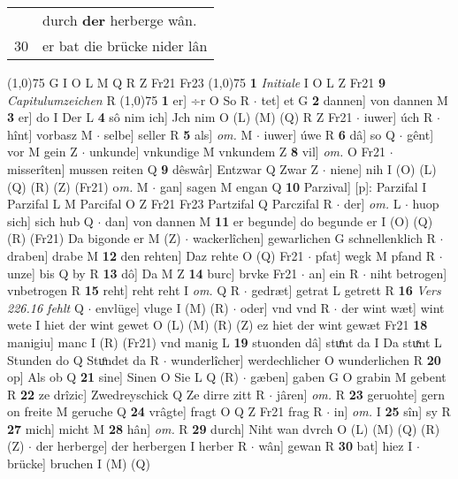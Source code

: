 \documentclass[8pt,a4paper,notitlepage]{article}
\begin{document}
\begin{table}[ht]
\begin{minipage}[t]{0.5\linewidth}
\begin{tabular}{rl}
 & durch \textbf{der} herberge wân.\\ 
30 & er bat die brücke nider lân\\ 
\end{tabular}
\scriptsize
\line(1,0){75} \newline
G I O L M Q R Z Fr21 Fr23 \newline
\line(1,0){75} \newline
\textbf{1} \textit{Initiale} I O L Z Fr21  \textbf{9} \textit{Capitulumzeichen} R  \newline
\line(1,0){75} \newline
\textbf{1} er] ÷r O So R  $\cdot$ tet] et G \textbf{2} dannen] von dannen M \textbf{3} er] do I Der L \textbf{4} sô nim ich] Jch nim O (L) (M) (Q) R Z Fr21  $\cdot$ iuwer] úch R  $\cdot$ hînt] vorbasz M  $\cdot$ selbe] seller R \textbf{5} als] \textit{om.} M  $\cdot$ iuwer] úwe R \textbf{6} dâ] so Q  $\cdot$ gênt] vor M gein Z  $\cdot$ unkunde] vnkundige M vnkundem Z \textbf{8} vil] \textit{om.} O Fr21  $\cdot$ misserîten] mussen reiten Q \textbf{9} dêswâr] Entzwar Q Zwar Z  $\cdot$ niene] nih I (O) (L) (Q) (R) (Z) (Fr21) o\textit{m. } M  $\cdot$ gan] sagen M engan Q \textbf{10} Parzival] [p]: Parzifal I Parzifal L M Parcifal O Z Fr21 Fr23 Partzifal Q Parczifal R  $\cdot$ der] \textit{om.} L  $\cdot$ huop sich] sich hub Q  $\cdot$ dan] von dannen M \textbf{11} er begunde] do begunde er I (O) (Q) (R) (Fr21) Da bigonde er M (Z)  $\cdot$ wackerlîchen] gewarlichen G schnellenklich R  $\cdot$ draben] drabe M \textbf{12} den rehten] Daz rehte O (Q) Fr21  $\cdot$ pfat] wegk M pfand R  $\cdot$ unze] bis Q by R \textbf{13} dô] Da M Z \textbf{14} burc] brvke Fr21  $\cdot$ an] ein R  $\cdot$ niht betrogen] vnbetrogen R \textbf{15} reht] reht reht I \textit{om.} Q R  $\cdot$ gedræt] getrat L getrett R \textbf{16} \textit{Vers 226.16 fehlt} Q   $\cdot$ envlüge] vluge I (M) (R)  $\cdot$ oder] vnd vnd R  $\cdot$ der wint wæt] wint wete I hiet der wint gewet O (L) (M) (R) (Z) ez hiet der wint gewæt Fr21 \textbf{18} manigiu] manc I (R) (Fr21) vnd manig L \textbf{19} stuonden dâ] stuͤnt da I Da stuͯnt L Stunden do Q Stuͦndet da R  $\cdot$ wunderlîcher] werdechlicher O wunderlichen R \textbf{20} op] Als ob Q \textbf{21} sine] Sinen O Sie L Q (R)  $\cdot$ gæben] gaben G O grabin M gebent R \textbf{22} ze drîzic] Zwedreyschick Q Ze dirre zitt R  $\cdot$ jâren] \textit{om.} R \textbf{23} geruohte] gern on freite M geruche Q \textbf{24} vrâgte] fragt O Q Z Fr21 frag R  $\cdot$ in] \textit{om.} I \textbf{25} sîn] sy R \textbf{27} mich] micht M \textbf{28} hân] \textit{om.} R \textbf{29} durch] Niht wan dvrch O (L) (M) (Q) (R) (Z)  $\cdot$ der herberge] der herbergen I herber R  $\cdot$ wân] gewan R \textbf{30} bat] hiez I  $\cdot$ brücke] bruchen I (M) (Q) \newline

\end{minipage}
\end{table}
\end{document}
